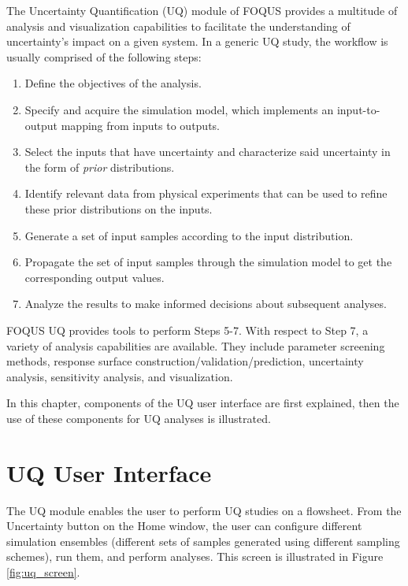 \label{sec:uq_overview}

The Uncertainty Quantification (UQ) module of FOQUS provides a multitude of analysis and visualization
capabilities to facilitate the understanding of uncertainty's impact on a
given system. In a generic UQ study, the workflow is usually comprised of the following
steps:

\begin{enumerate}
	\item Define the objectives of the analysis.
	\item Specify and acquire the simulation model, which implements an
     input-to-output mapping from inputs to outputs.
	\item Select the inputs that have uncertainty and characterize said
     uncertainty in the form of \emph{prior} distributions.
	\item Identify relevant data from physical experiments that can be used
     to refine these prior distributions on the inputs.
	\item Generate a set of input samples according to the input
     distribution.
	\item Propagate the set of input samples through the simulation model to 
     get the corresponding output values.
	\item Analyze the results to make informed decisions about subsequent analyses.
\end{enumerate}
FOQUS UQ provides tools to perform Steps 5-7. With respect to Step 7, a
variety of analysis capabilities are available. They include parameter
screening methods, response surface construction/validation/prediction,
uncertainty analysis, sensitivity analysis, and visualization.

In this chapter, components of the UQ user interface are first explained,
then the use of these components for UQ analyses is illustrated.

\section{UQ User Interface}

The UQ module enables the user to perform UQ studies on a flowsheet. 
From the Uncertainty button on the Home window, the user can configure different simulation ensembles
(different sets of samples generated using different sampling schemes), run
them, and perform analyses. This screen is illustrated in Figure
\ref{fig:uq_screen}.

